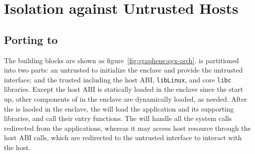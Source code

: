 \section{Isolation against Untrusted Hosts}
\label{sec:graphene:sgx}





\subsection{Porting \graphene{} to \intel{} \sgx{}}


The building blocks are shown as figure~\ref{fig:graphene:sgx-arch}.
\graphenesgx{} is partitioned into two parts:
an untrusted \pal{} to initialize the enclave and provide the untrusted interface;
and the trusted \libos{} including the host ABI, {\tt libLinux}, and core {\tt libc} libraries.
Except the host ABI is statically loaded in the enclave since the start up,
other components of \graphenesgx{} in the enclave are dynamically loaded,
as needed. 
After the \libos{} is laoded in the enclave,
the \libos{} will load the application and its supporting libraries,
and call their entry functions.
The \libos{} will handle all the system calls redirected from the applications,
whereas it may access host resource through the host ABI calls,
which are redirected to the untrusted interface
to interact with the host. 

